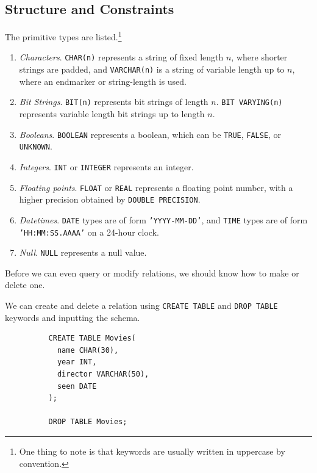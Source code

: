 \documentclass{article}
\begin{document}
  \subsection{Structure and Constraints}

      \begin{definition}
        The primitive types are listed.\footnote{One thing to note is that keywords are usually written in uppercase by convention.}
        \begin{enumerate}
          \item \textit{Characters}. \texttt{CHAR(n)} represents a string of fixed length $n$, where shorter strings are padded, and \texttt{VARCHAR(n)} is a string of variable length up to $n$, where an endmarker or string-length is used. 
          \item \textit{Bit Strings}. \texttt{BIT(n)} represents bit strings of length $n$. \texttt{BIT VARYING(n)} represents variable length bit strings up to length $n$. 
          \item \textit{Booleans}. \texttt{BOOLEAN} represents a boolean, which can be \texttt{TRUE}, \texttt{FALSE}, or \texttt{UNKNOWN}. 
          \item \textit{Integers}. \texttt{INT} or \texttt{INTEGER} represents an integer. 
          \item \textit{Floating points}. \texttt{FLOAT} or \texttt{REAL} represents a floating point number, with a higher precision obtained by \texttt{DOUBLE PRECISION}. 
          \item \textit{Datetimes}. \texttt{DATE} types are of form \texttt{'YYYY-MM-DD'}, and \texttt{TIME} types are of form \texttt{'HH:MM:SS.AAAA'} on a 24-hour clock. 
          \item \textit{Null}. \texttt{NULL} represents a null value. 
        \end{enumerate}
      \end{definition}
      
      Before we can even query or modify relations, we should know how to make or delete one. 

      \begin{theorem}
        We can create and delete a relation using \texttt{CREATE TABLE} and \texttt{DROP TABLE} keywords and inputting the schema. 
        \begin{lstlisting}
          CREATE TABLE Movies(
            name CHAR(30), 
            year INT, 
            director VARCHAR(50), 
            seen DATE
          ); 

          DROP TABLE Movies; 
        \end{lstlisting}
      \end{theorem}
\end{document}
